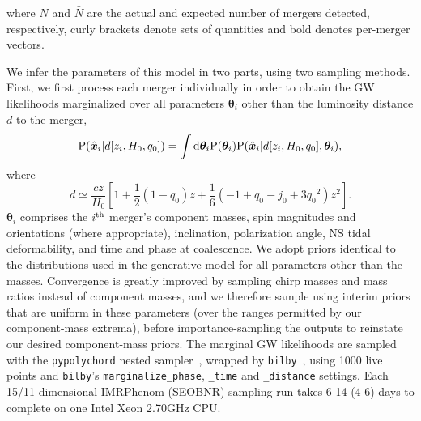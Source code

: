 \documentclass[%
 reprint,
 superscriptaddress,
 nofootinbib,
 amsmath,amssymb,
 aps,
]{revtex4-2}
\newcommand{\hubble}{\ensuremath{H_0}}
\newcommand{\decel}{\ensuremath{q_0}}
\newcommand{\jerk}{\ensuremath{j_0}}
\newcommand{\prob}{\ensuremath{{\rm P}}}
\newcommand{\nexp}{\bar{N}}
\newcommand{\snrmin}{\rho_*}
\newcommand{\mejmin}{m_{\rm ej}^*}
\newcommand{\dgw}{\hat{\bm{x}}}
\begin{document}
%
where $N$ and $\nexp$ are the actual and expected number of mergers detected, respectively, curly brackets denote sets of quantities and bold denotes per-merger vectors.

We infer the parameters of this model in two parts, using two sampling methods. First, we first process each merger individually in order to obtain the GW likelihoods marginalized over all parameters $\boldsymbol{\theta}_i$ other than the luminosity distance $d$ to the merger,
\begin{equation*}
\prob(\dgw_i | d[ z_i, \hubble, \decel ]) = \int {\rm d}\boldsymbol{\theta}_i \prob(\boldsymbol{\theta}_i) \prob(\dgw_i | d[ z_i, \hubble, \decel ], \boldsymbol{\theta}_i),
\end{equation*}
where
\begin{equation*}
d \simeq \frac{cz}{\hubble} \left[1 + \frac{1}{2} \left(1 - \decel \right) z + \frac{1}{6} \left(-1 + \decel - \jerk + 3 \decel^2 \right) z^2 \right].
\end{equation*}
$\boldsymbol{\theta}_i$ comprises the $i^{\rm th}$ merger's component masses, spin magnitudes and orientations (where appropriate), inclination, polarization angle, NS tidal deformability, and time and phase at coalescence. We adopt priors identical to the distributions used in the generative model for all parameters other than the masses. Convergence is greatly improved by sampling chirp masses and mass ratios instead of component masses, and we therefore sample using interim priors that are uniform in these parameters (over the ranges permitted by our component-mass extrema), before importance-sampling the outputs to reinstate our desired component-mass priors. The marginal GW likelihoods are sampled with the \texttt{pypolychord} nested sampler~\cite{Handley_etal:2015a,Handley_etal:2015b}, wrapped by \texttt{bilby}~\cite{Ashton_etal:2019}, using 1000 live points and \texttt{bilby}'s \texttt{marginalize\_phase}, \texttt{\_time} and \texttt{\_distance} settings. Each 15/11-dimensional IMRPhenom (SEOBNR) sampling run takes 6-14 (4-6) days to complete on one Intel Xeon 2.70GHz CPU.
\end{document}
